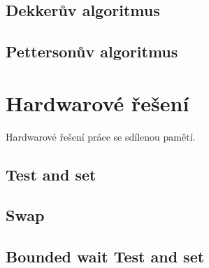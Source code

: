 \subsection{Dekkerův algoritmus}

\begin{compactitem}
    \item {}
\end{compactitem}

\subsection{Pettersonův algoritmus}

\begin{compactitem}
    \item {}
\end{compactitem}


\section{Hardwarové řešení}

\begin{compactitem}
    \item Hardwarové řešení práce se sdílenou pamětí.
\end{compactitem}

\subsection{Test and set}

\begin{compactitem}
    \item {}
\end{compactitem}

\subsection{Swap}

\begin{compactitem}
    \item {}
\end{compactitem}

\subsection{Bounded wait Test and set}

